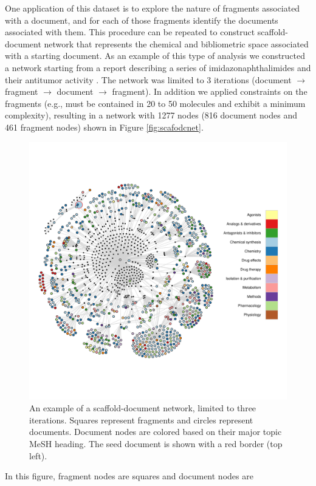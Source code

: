 \documentclass[]{book}
\begin{document}
One application of this dataset is to explore the nature of fragments
associated with a document, and for each of those fragments identify
the documents associated with them. This procedure can be repeated to
construct scaffold-document network that represents the chemical and
bibliometric space associated with a starting document. As an example
of this type of analysis we constructed a network starting from a
report describing a series of imidazonaphthalimides and their
antitumor activity \cite{Brana:2002pr}. The network was limited to 3
iterations (document $\rightarrow$ fragment $\rightarrow$ document
$\rightarrow$ fragment). In addition we applied constraints on the
fragments (e.g., must be contained in 20 to 50 molecules and exhibit a
minimum complexity), resulting in a network with 1277 nodes (816
document nodes and 461 fragment nodes) shown in Figure
\ref{fig:scafodcnet}. 
\begin{figure}[h]
  \centering
  \includegraphics[width=\linewidth]{img/12477366}
  \caption{An example of a scaffold-document network, limited to three
    iterations. Squares represent fragments and circles represent
    documents. Document nodes are colored based on their major topic
    MeSH heading. The seed document is shown with a red border (top
    left).}
  \label{fig:scafdocnet}
\end{figure}
In this figure, fragment nodes are squares and document nodes are
\end{document}
